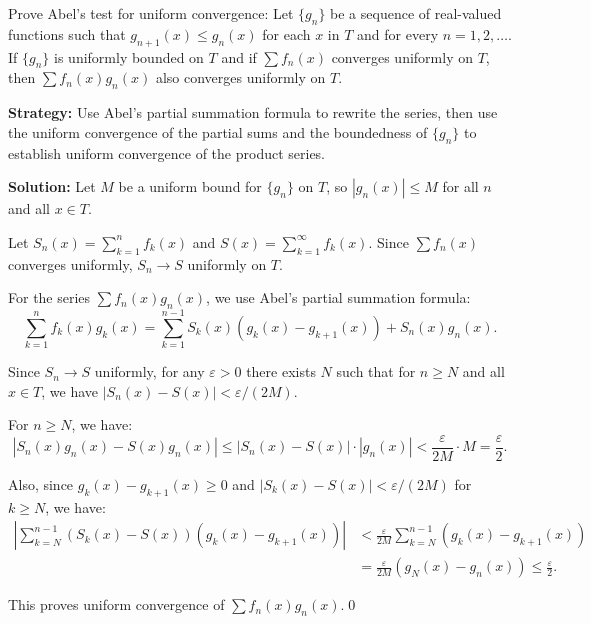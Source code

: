 \begin{problembox}
\begin{problemstatement}
Prove Abel's test for uniform convergence: Let \( \{g_n\} \) be a sequence of real-valued functions such that \( g_{n+1}(x) \leq g_n(x) \) for each \( x \) in \( T \) and for every \( n = 1, 2, \ldots \). If \( \{g_n\} \) is uniformly bounded on \( T \) and if \(\sum f_n(x)\) converges uniformly on \( T \), then \(\sum f_n(x)g_n(x)\) also converges uniformly on \( T \).
\end{problemstatement}
\end{problembox}

\noindent\textbf{Strategy:} Use Abel's partial summation formula to rewrite the series, then use the uniform convergence of the partial sums and the boundedness of \( \{g_n\} \) to establish uniform convergence of the product series.

\bigskip\noindent\textbf{Solution:} Let \( M \) be a uniform bound for \( \{g_n\} \) on \( T \), so \( |g_n(x)| \leq M \) for all \( n \) and all \( x \in T \).

Let \( S_n(x) = \sum_{k=1}^n f_k(x) \) and \( S(x) = \sum_{k=1}^{\infty} f_k(x) \). Since \( \sum f_n(x) \) converges uniformly, \( S_n \to S \) uniformly on \( T \).

For the series \( \sum f_n(x)g_n(x) \), we use Abel's partial summation formula:
\[\sum_{k=1}^n f_k(x)g_k(x) = \sum_{k=1}^{n-1} S_k(x)(g_k(x) - g_{k+1}(x)) + S_n(x)g_n(x).\]

Since \( S_n \to S \) uniformly, for any \( \varepsilon > 0 \) there exists \( N \) such that for \( n \geq N \) and all \( x \in T \), we have \( |S_n(x) - S(x)| < \varepsilon/(2M) \).

For \( n \geq N \), we have:
\[|S_n(x)g_n(x) - S(x)g_n(x)| \leq |S_n(x) - S(x)| \cdot |g_n(x)| < \frac{\varepsilon}{2M} \cdot M = \frac{\varepsilon}{2}.\]

Also, since \( g_k(x) - g_{k+1}(x) \geq 0 \) and \( |S_k(x) - S(x)| < \varepsilon/(2M) \) for \( k \geq N \), we have:
\begin{align*}
\left|\sum_{k=N}^{n-1} (S_k(x) - S(x))(g_k(x) - g_{k+1}(x))\right| &< \frac{\varepsilon}{2M} \sum_{k=N}^{n-1} (g_k(x) - g_{k+1}(x)) \\
&= \frac{\varepsilon}{2M}(g_N(x) - g_n(x)) \leq \frac{\varepsilon}{2}.
\end{align*}

This proves uniform convergence of \( \sum f_n(x)g_n(x) \).\qed


